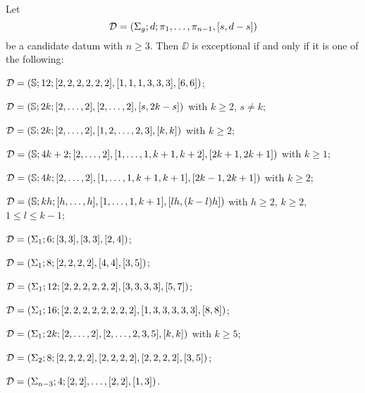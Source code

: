 \begin{solution-hurwitz*}
Let
\[
\mathcal{D}=(\Sigma_{g};d;\pi_1,\ldots,\pi_{n-1},[s,d-s])
\]
be a candidate datum with $n\ge 3$. Then $\DD$ is exceptional if and only if it is one of the following:
\begin{enumarabic}
\item $\mathcal{D}=(\mathbb{S}{};12;[2,2,2,2,2,2],[1,1,1,3,3,3],[6,6])$;
\item $\mathcal{D}=(\mathbb{S}{};2k;[2,\ldots,2],[2,\ldots,2],[s,2k-s])$ with $k\ge 2$, $s\neq k$;
\item $\mathcal{D}=(\mathbb{S}{};2k;[2,\ldots,2],[1,2,\ldots,2,3],[k,k])$ with $k\ge2$;
\item $\mathcal{D}=(\mathbb{S}{};4k+2;[2,\ldots,2],[1,\ldots,1,k+1,k+2],[2k+1,2k+1])$ with $k\ge 1$;
\item $\mathcal{D}=(\mathbb{S}{};4k;[2,\ldots,2],[1,\ldots,1,k+1,k+1],[2k-1,2k+1])$ with $k\ge2$;
\item $\mathcal{D}=(\mathbb{S}{};kh;[h,\ldots,h],[1,\ldots,1,k+1],[lh,(k-l)h])$ with $h\ge 2$, $k\ge 2$, $1\le l\le k-1$;
\item $\mathcal{D}=(\Sigma_{1};6;[3,3],[3,3],[2,4])$;
\item $\mathcal{D}=(\Sigma_{1};8;[2,2,2,2],[4,4],[3,5])$;
\item $\mathcal{D}=(\Sigma_{1};12;[2,2,2,2,2,2],[3,3,3,3],[5,7])$;
\item $\mathcal{D}=(\Sigma_{1};16;[2,2,2,2,2,2,2,2],[1,3,3,3,3,3],[8,8])$;
\item $\mathcal{D}=(\Sigma_{1};2k;[2,\ldots,2],[2,\ldots,2,3,5],[k,k])$ with $k\ge 5$;
\item $\mathcal{D}=(\Sigma_{2};8;[2,2,2,2],[2,2,2,2],[2,2,2,2],[3,5])$;
\item $\mathcal{D}=(\Sigma_{n-3};4;[2,2],\ldots,[2,2],[1,3])$.
\end{enumarabic}
\end{solution-hurwitz*}